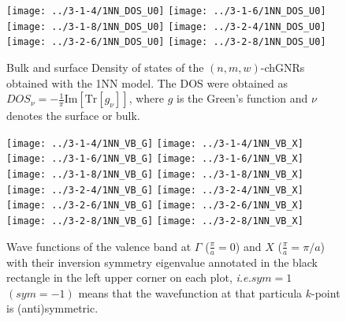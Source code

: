 \documentclass[amsmath,%
amssymb,prb,superscriptaddress]{revtex4}
\newcommand{\ie}[1]{\textit{i.e.}}
\begin{document}
\begin{figure*}
	\texttt{[image: ../3-1-4/1NN\_DOS\_U0]}
	\texttt{[image: ../3-1-6/1NN\_DOS\_U0]}
	\texttt{[image: ../3-1-8/1NN\_DOS\_U0]}
	\texttt{[image: ../3-2-4/1NN\_DOS\_U0]}
	\texttt{[image: ../3-2-6/1NN\_DOS\_U0]}
	\texttt{[image: ../3-2-8/1NN\_DOS\_U0]}
	\caption{Bulk and surface Density of states of the $(n,m,w)$-chGNRs obtained with the 1NN model. The DOS were obtained as $DOS_{\nu}=-\frac{1}{\pi}\mathrm{Im}\left[\mathrm{Tr}\left[ g_{\nu} \right]\right]$, where $g$ is the Green's function and $\nu$ denotes the surface or bulk.}
\end{figure*}


\begin{figure*}
	\texttt{[image: ../3-1-4/1NN\_VB\_G]}
	\texttt{[image: ../3-1-4/1NN\_VB\_X]}\\
	\texttt{[image: ../3-1-6/1NN\_VB\_G]}
	\texttt{[image: ../3-1-6/1NN\_VB\_X]}\\
	\texttt{[image: ../3-1-8/1NN\_VB\_G]}
	\texttt{[image: ../3-1-8/1NN\_VB\_X]}\\
	\texttt{[image: ../3-2-4/1NN\_VB\_G]}	
	\texttt{[image: ../3-2-4/1NN\_VB\_X]}\\
	\texttt{[image: ../3-2-6/1NN\_VB\_G]}
	\texttt{[image: ../3-2-6/1NN\_VB\_X]}\\
	\texttt{[image: ../3-2-8/1NN\_VB\_G]}
	\texttt{[image: ../3-2-8/1NN\_VB\_X]}
	\caption{Wave functions of the valence band at $\Gamma$ ($\frac{\pi}{a}=0$) and $X$ ($\frac{\pi}{a}=\pi/a$) with their inversion symmetry eigenvalue annotated in the black rectangle in the left upper corner on each plot, \ie \ $sym=1$ $(sym=-1)$ means that the wavefunction at that particula $k$-point is (anti)symmetric.}
\end{figure*}
\end{document}
